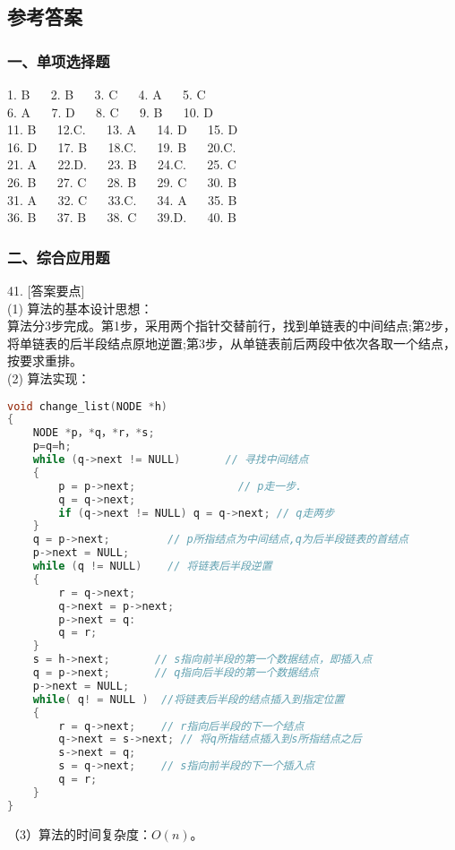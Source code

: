 \subsection{参考答案}

\subsubsection{一、单项选择题}
1. B $\quad$ 2. B $\quad$ 3. C $\quad$ 4. A $\quad$ 5. C \\
6. A $\quad$ 7. D $\quad$ 8. C $\quad$ 9. B $\quad$ 10. D \\
11. B $\quad$ 12.C. $\quad$ 13. A $\quad$ 14. D $\quad$ 15. D \\
16. D $\quad$ 17. B $\quad$ 18.C. $\quad$ 19. B $\quad$ 20.C. \\
21. A $\quad$ 22.D. $\quad$ 23. B $\quad$ 24.C. $\quad$ 25. C \\
26. B $\quad$ 27. C $\quad$ 28. B $\quad$ 29. C $\quad$ 30. B \\
31. A $\quad$ 32. C $\quad$ 33.C. $\quad$ 34. A $\quad$ 35. B \\
36. B $\quad$ 37. B $\quad$ 38. C $\quad$ 39.D. $\quad$ 40. B \\

\subsubsection{二、综合应用题}
41. [答案要点] \\
(1) 算法的基本设计思想： \\
算法分3步完成。第1步，采用两个指针交替前行，找到单链表的中间结点;第2步，将单链表的后半段结点原地逆置;第3步，从单链表前后两段中依次各取一个结点，按要求重排。 \\
(2) 算法实现：
\begin{lstlisting}[language=cpp]
void change_list(NODE *h)
{
    NODE *p，*q，*r，*s;
    p=q=h;
    while (q->next != NULL)       // 寻找中间结点
    {
        p = p->next;                // p走一步.
        q = q->next;
        if (q->next != NULL) q = q->next; // q走两步
    }
    q = p->next;         // p所指结点为中间结点,q为后半段链表的首结点
    p->next = NULL;
    while (q != NULL)    // 将链表后半段逆置
    {
        r = q->next;
        q->next = p->next;
        p->next = q:
        q = r;
    }
    s = h->next;       // s指向前半段的第一个数据结点，即插入点
    q = p->next;       // q指向后半段的第一个数据结点
    p->next = NULL;
    while( q! = NULL )  //将链表后半段的结点插入到指定位置
    {
        r = q->next;    // r指向后半段的下一个结点
        q->next = s->next; // 将q所指结点插入到s所指结点之后
        s->next = q;
        s = q->next;    // s指向前半段的下一个插入点
        q = r;
    }
}
\end{lstlisting}
（3）算法的时间复杂度：$O(n)$。

